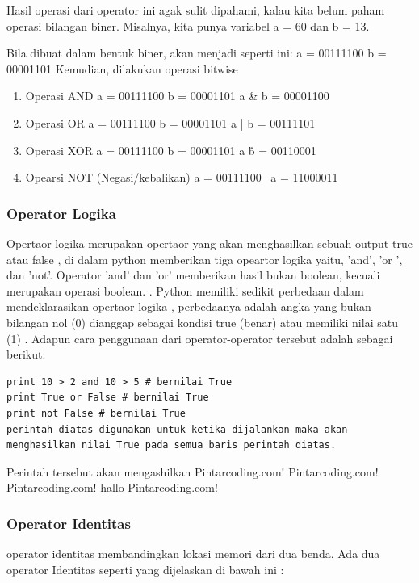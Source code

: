 Hasil operasi dari operator ini agak sulit dipahami, kalau kita belum paham operasi bilangan biner.
Misalnya, kita punya variabel a = 60 dan b = 13.

Bila dibuat dalam bentuk biner, akan menjadi seperti ini:
a = 00111100
b = 00001101
Kemudian, dilakukan operasi bitwise

\begin{enumerate}
\item Operasi AND
      a = 00111100
      b = 00001101
      a & b = 00001100
      
\item Operasi OR
      a = 00111100
      b = 00001101
      a | b = 00111101

\item Operasi XOR
      a = 00111100
      b = 00001101
      a \^ b = 00110001

\item Opearsi NOT (Negasi/kebalikan)
      a = 00111100
      ~a  = 11000011
      
\end{enumerate}


\subsubsection{Operator Logika}
Opertaor logika merupakan opertaor yang akan menghasilkan sebuah output true atau false , di dalam python memberikan tiga opeartor logika yaitu, 'and', 'or ', dan 'not'. Operator 'and' dan 'or' memberikan hasil bukan boolean, kecuali merupakan operasi boolean. . Python memiliki sedikit perbedaan dalam mendeklarasikan opertaor logika , perbedaanya adalah angka yang bukan bilangan nol (0) dianggap sebagai kondisi true (benar) atau memiliki nilai satu (1) .
Adapun cara penggunaan dari operator-operator tersebut adalah sebagai berikut:

\begin{verbatim}
print 10 > 2 and 10 > 5 # bernilai True
print True or False # bernilai True
print not False # bernilai True
perintah diatas digunakan untuk ketika dijalankan maka akan menghasilkan nilai True pada semua baris perintah diatas.
\end{verbatim}

Perintah tersebut akan mengashilkan
Pintarcoding.com! Pintarcoding.com! Pintarcoding.com! 
hallo Pintarcoding.com!

\subsubsection{Operator Identitas}
operator identitas membandingkan lokasi memori dari dua benda. Ada dua operator Identitas seperti yang dijelaskan di bawah ini :

